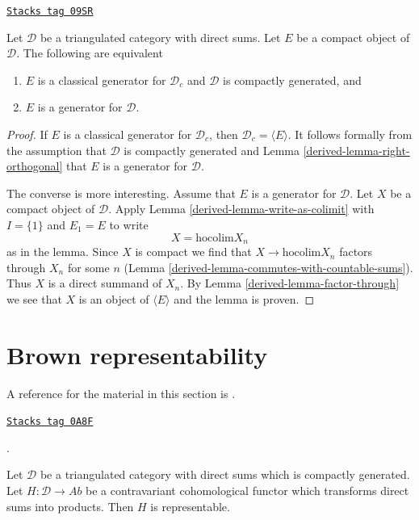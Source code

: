 \begin{proposition}
\label{derived-proposition-generator-versus-classical-generator}
\href{https://stacks.math.columbia.edu/tag/09SR}{\texttt{Stacks tag 09SR}}

Let $\mathcal{D}$ be a triangulated category with direct sums.
Let $E$ be a compact object of $\mathcal{D}$.
The following are equivalent
\begin{enumerate}
\item $E$ is a classical generator for $\mathcal{D}_c$ and
$\mathcal{D}$ is compactly generated, and
\item $E$ is a generator for $\mathcal{D}$.
\end{enumerate}
\end{proposition}

\begin{proof}

If $E$ is a classical generator for $\mathcal{D}_c$, then
$\mathcal{D}_c = \langle E \rangle$. It follows formally
from the assumption that $\mathcal{D}$ is compactly generated
and Lemma \ref{derived-lemma-right-orthogonal} that $E$ is a generator
for $\mathcal{D}$.

\medskip\noindent
The converse is more interesting. Assume that $E$ is a generator
for $\mathcal{D}$. Let $X$ be a compact object of $\mathcal{D}$.
Apply Lemma \ref{derived-lemma-write-as-colimit} with $I = \{1\}$ and
$E_1 = E$ to write
$$
X = \text{hocolim} X_n
$$
as in the lemma. Since $X$ is compact we
find that $X \to \text{hocolim} X_n$ factors through $X_n$ for
some $n$ (Lemma \ref{derived-lemma-commutes-with-countable-sums}).
Thus $X$ is a direct summand of $X_n$.
By Lemma \ref{derived-lemma-factor-through} we see that $X$ is an
object of $\langle E \rangle$ and the lemma is proven.
\end{proof}

\section{Brown representability}
\label{derived-section-brown}
A reference for the material in this section is \cite{Neeman-Grothendieck}.

\begin{lemma}[Brown]
\label{derived-lemma-brown}
\href{https://stacks.math.columbia.edu/tag/0A8F}{\texttt{Stacks tag 0A8F}}

\begin{reference}
\cite[Theorem 3.1]{Neeman-Grothendieck}.
\end{reference}
Let $\mathcal{D}$ be a triangulated category with direct sums which is
compactly generated. Let $H : \mathcal{D} \to \textit{Ab}$ be a contravariant
cohomological functor which transforms direct sums into products.
Then $H$ is representable.
\end{lemma}

